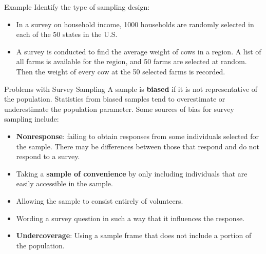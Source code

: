 \documentclass{beamer}
\begin{document}
\begin{frame}{Example}
Identify the type of sampling design:\\
\vspace{10pt}
\begin{itemize}
\item In a survey on household income, 1000 households are randomly selected in each of the 50 states in the U.S.\\
\vspace{10pt}  
\item A survey is conducted to find the average weight of cows in a region.  A list of all farms is available for the region, and 50 farms are selected at random.  Then the weight of every cow at the 50 selected farms is recorded.\\
\end{itemize}
\end{frame}

\begin{frame}{Problems with Survey Sampling}
A sample is \textbf{biased} if it is not representative of the population.  Statistics from biased samples tend to overestimate or underestimate the population parameter.  Some sources of bias for survey sampling include:\\
\begin{itemize}
\item \textbf{Nonresponse}: failing to obtain responses from some individuals selected for the sample.  There may be differences between those that respond and do not respond to a survey.  
\item Taking a \textbf{sample of convenience} by only including individuals that are easily accessible in the sample.
\item Allowing the sample to consist entirely of volunteers.
\item Wording a survey question in such a way that it influences the response.
\item \textbf{Undercoverage}: Using a sample frame that does not include a portion of the population.
\end{itemize}
\end{frame}
\end{document}
